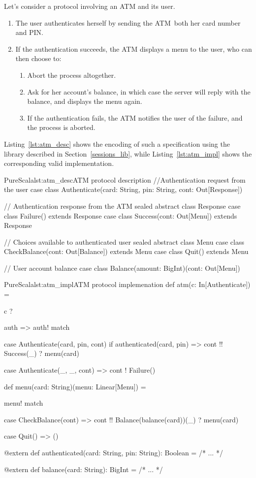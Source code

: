 \documentclass[a4paper,twoside]{article}
\newcommand{\RefSec}[1]{Section~\ref{#1}}
\newcommand{\RefCode}[1]{Listing~\ref{#1}}
\begin{document}
Let's consider a protocol involving an ATM and its user.

\begin{enumerate}
\item The user authenticates herself by sending the ATM both her card number and PIN.
\item If the authentication succeeds, the ATM displays a menu to the user, who can then choose to:
\begin{enumerate}
\item Abort the process altogether.
\item Ask for her account's balance, in which case the server will reply with the balance, and displays the menu again.
\item If the authentication fails, the ATM notifies the user of the failure, and the process is aborted.
\end{enumerate}
\end{enumerate}

\RefCode{lst:atm_desc} shows the encoding of such a specification using the library described in \RefSec{sessions_lib}, while \RefCode{lst:atm_impl} shows the corresponding valid implementation.

\begin{Code}{PureScala}{lst:atm_desc}{ATM protocol description}
//Authentication request from the user
case class Authenticate(card: String, pin: String, cont: Out[Response])

// Authentication response from the ATM
sealed abstract class Response
case class Failure()                extends Response
case class Success(cont: Out[Menu]) extends Response

// Choices available to authenticated user
sealed abstract class Menu
case class CheckBalance(cont: Out[Balance]) extends Menu
case class Quit()                           extends Menu

// User account balance
case class Balance(amount: BigInt)(cont: Out[Menu])
\end{Code}

\begin{Code}{PureScala}{lst:atm_impl}{ATM protocol implemenation}
def atm(c: In[Authenticate]) = {
  c ? { auth => auth! match {  
    case Authenticate(card, pin, cont) if authenticated(card, pin) =>
      cont !! Success(_) ? menu(card)
  
    case Authenticate(_, _, cont)  =>
      cont ! Failure()
  } }
}

def menu(card: String)(menu: Linear[Menu]) = {
  menu! match {
    case CheckBalance(cont) =>
      cont !! Balance(balance(card))(_) ? menu(card)

    case Quit() => ()
  }
}

@extern
def authenticated(card: String, pin: String): Boolean = {
  /* ... */
}

@extern
def balance(card: String): BigInt = {
  /* ... */
}
\end{Code}
\end{document}

